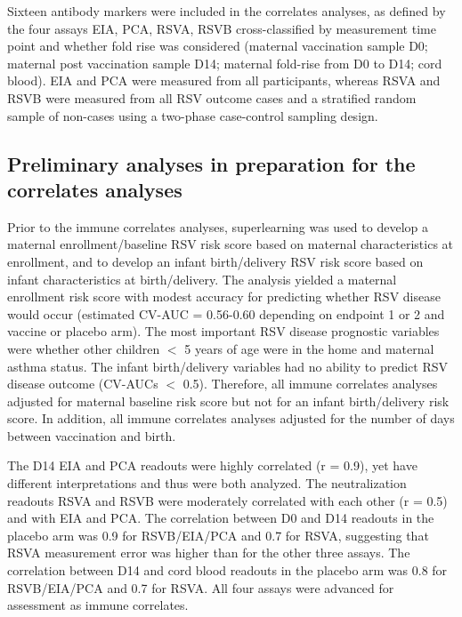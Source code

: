 \documentclass[11pt]{article}
\begin{document}
Sixteen antibody markers were included in the correlates analyses, as defined by the four assays EIA, PCA, RSVA, RSVB cross-classified by measurement time point and whether fold rise was considered (maternal vaccination sample D0; maternal post vaccination sample D14; maternal fold-rise from D0 to D14; cord blood).
EIA and PCA were measured from all participants, whereas
RSVA and RSVB were measured from all RSV outcome cases and a stratified random sample of non-cases using a two-phase case-control sampling design.

\hypertarget{preliminary-analyses-in-preparation-for-the-correlates-analyses}{%
\subsection{Preliminary analyses in preparation for the correlates analyses}\label{preliminary-analyses-in-preparation-for-the-correlates-analyses}}

Prior to the immune correlates analyses, superlearning was used to develop a maternal enrollment/baseline RSV risk score based on maternal characteristics at enrollment, and to develop an infant birth/delivery RSV risk score based on infant characteristics at birth/delivery. The analysis yielded a maternal enrollment risk score with modest accuracy for predicting whether RSV disease would occur (estimated CV-AUC = 0.56-0.60 depending on endpoint 1 or 2 and vaccine or placebo arm). The most important RSV disease prognostic variables were whether other children \(<\) 5 years of age were in the
home and maternal asthma status.
The infant birth/delivery variables had no ability to predict RSV disease outcome (CV-AUCs \(<\) 0.5). Therefore, all immune correlates analyses adjusted for maternal baseline risk score but not for an infant birth/delivery risk score. In addition, all immune correlates analyses adjusted for the number of days between vaccination and birth.

The D14 EIA and PCA readouts were highly correlated (r = 0.9), yet have different interpretations and thus were both analyzed. The neutralization readouts RSVA and RSVB were moderately correlated with each other (r = 0.5) and with EIA and PCA. The correlation between D0 and D14 readouts in the placebo arm was 0.9 for RSVB/EIA/PCA and 0.7 for RSVA, suggesting that RSVA measurement error was higher than for the other three assays. The correlation between D14 and cord blood readouts in the placebo arm was 0.8 for RSVB/EIA/PCA and 0.7 for RSVA. All four assays were advanced for assessment as immune correlates.
\end{document}
